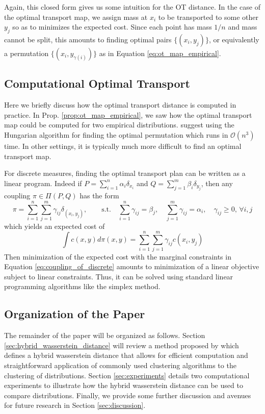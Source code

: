 \documentclass[11pt, a4paper, fleqn]{article}
\let\normalint\int %
\def\int{\displaystyle\normalint} %
\numberwithin{equation}{section}
\numberwithin{figure}{section}
\numberwithin{table}{section}
\renewcommand{\geq}{\geqslant}
\begin{document}
Again, this closed form gives us some intuition for the OT distance. In the case of the optimal transport map, we assign mass at $x_i$ to be transported to some other $y_j$ so as to minimizes the expected cost. Since each point has mass $1/n$ and mass cannot be split, this amounts to finding optimal pairs $\{(x_i, y_j)\}$, or equivalently a permutation $\{(x_i, y_{\gamma(i)})\}$ as in Equation \eqref{eq:ot_map_empirical}.

\subsection{Computational Optimal Transport}
Here we briefly discuss how the optimal transport distance is computed in practice. In Prop. \ref{prop:ot_map_empirical}, we saw how the optimal transport map could be computed for two empirical distributions. \cite{verdinelli2018hybrid} suggest using the Hungarian algorithm for finding the optimal permutation which runs in $\mathcal{O}(n^3)$ time. In other settings, it is typically much more difficult to find an optimal transport map.

For discrete measures, finding the optimal transport plan can be written as a linear program. Indeed if $P = \sum_{i=1}^n \alpha_i\delta_{x_i}$ and $Q = \sum_{j=1}^m \beta_i \delta_{y_j}$, then any coupling $\pi \in \Pi(P, Q)$ has the form
\begin{equation}\label{eq:coupling_of_discrete}
\pi = \sum\limits_{i=1}^n \sum\limits_{j=1}^m \gamma_{ij} \delta_{(x_i, y_j)}, \quad\quad\mbox{s.t.} \quad \sum\limits_{i=1}^n \gamma_{ij} = \beta_j, \quad \sum\limits_{j=1}^m \gamma_{ij} = \alpha_i, \quad \gamma_{ij} \geq 0, \, \forall i, j
\end{equation}
which yields an expected cost of
\begin{equation}
\int c(x, y) d\pi(x, y) = \sum\limits_{i=1}^n \sum\limits_{j=1}^m \gamma_{ij} c(x_i, y_j)
\end{equation}
Then minimization of the expected cost with the marginal constraints in Equation \eqref{eq:coupling_of_discrete} amounts to minimization of a linear objective subject to linear constraints. Thus, it can be solved using standard linear programming algorithms like the simplex method.

\subsection{Organization of the Paper}
The remainder of the paper will be organized as follows. Section \ref{sec:hybrid_wasserstein_distance} will review a method proposed by \cite{verdinelli2018hybrid} which defines a hybrid wasserstein distance that allows for efficient computation and straightforward application of commonly used clustering algorithms to the clustering of distributions. Section \ref{sec:experiments} details two computational experiments to illustrate how the hybrid wasserstein distance can be used to compare distributions. Finally, we provide some further discussion and avenues for future research in Section \ref{sec:discussion}.
\end{document}
